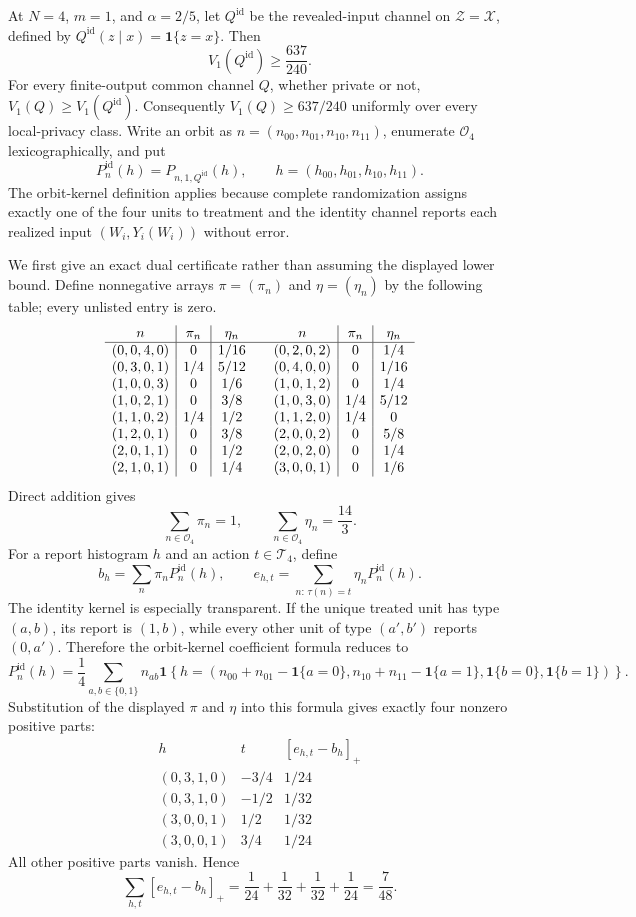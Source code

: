 At \(N=4\), \(m=1\), and \(\alpha=2/5\), let \(Q^{\mathrm{id}}\) be the revealed-input channel on \(\mathcal Z=\mathcal X\), defined by \(Q^{\mathrm{id}}(z\mid x)=\mathbf 1\{z=x\}\). Then
\[
 V_1(Q^{\mathrm{id}})\ge \frac{637}{240}.
\]
For every finite-output common channel \(Q\), whether private or not, \(V_1(Q)\ge V_1(Q^{\mathrm{id}})\). Consequently \(V_1(Q)\ge637/240\) uniformly over every local-privacy class.
Write an orbit as \(n=(n_{00},n_{01},n_{10},n_{11})\), enumerate \(\mathcal O_4\) lexicographically, and put
\[
 P^{\mathrm{id}}_n(h)=P_{n,1,Q^{\mathrm{id}}}(h),
 \qquad
 h=(h_{00},h_{01},h_{10},h_{11}).
\]
The orbit-kernel definition applies because complete randomization assigns exactly one of the four units to treatment and the identity channel reports each realized input \((W_i,Y_i(W_i))\) without error.

We first give an exact dual certificate rather than assuming the displayed lower bound. Define nonnegative arrays \(\pi=(\pi_n)\) and \(\eta=(\eta_n)\) by the following table; every unlisted entry is zero.
\[
\begin{array}{c|c|c@{\qquad}c|c|c}
n&\pi_n&\eta_n&n&\pi_n&\eta_n\\ \hline
(0,0,4,0)&0&1/16 &(0,2,0,2)&0&1/4\\
(0,3,0,1)&1/4&5/12 &(0,4,0,0)&0&1/16\\
(1,0,0,3)&0&1/6 &(1,0,1,2)&0&1/4\\
(1,0,2,1)&0&3/8 &(1,0,3,0)&1/4&5/12\\
(1,1,0,2)&1/4&1/2 &(1,1,2,0)&1/4&0\\
(1,2,0,1)&0&3/8 &(2,0,0,2)&0&5/8\\
(2,0,1,1)&0&1/2 &(2,0,2,0)&0&1/4\\
(2,1,0,1)&0&1/4 &(3,0,0,1)&0&1/6
\end{array}
\]
Direct addition gives
\[
 \sum_{n\in\mathcal O_4}\pi_n=1,
 \qquad
 \sum_{n\in\mathcal O_4}\eta_n=\frac{14}{3}.
\]
For a report histogram \(h\) and an action \(t\in\mathcal T_4\), define
\[
 b_h=\sum_n\pi_nP^{\mathrm{id}}_n(h),
 \qquad
 e_{h,t}=\sum_{n:\,\tau(n)=t}\eta_nP^{\mathrm{id}}_n(h).
\]
The identity kernel is especially transparent. If the unique treated unit has type \((a,b)\), its report is \((1,b)\), while every other unit of type \((a',b')\) reports \((0,a')\). Therefore the orbit-kernel coefficient formula reduces to
\[
 P^{\mathrm{id}}_n(h)
 =\frac14\sum_{a,b\in\{0,1\}}n_{ab}
 \mathbf 1\!\left\{
 h=\left(
 n_{00}+n_{01}-\mathbf 1\{a=0\},
 n_{10}+n_{11}-\mathbf 1\{a=1\},
 \mathbf 1\{b=0\},
 \mathbf 1\{b=1\}
 \right)\right\}.
\]
Substitution of the displayed \(\pi\) and \(\eta\) into this formula gives exactly four nonzero positive parts:
\[
\begin{array}{c|c|c}
h&t&[e_{h,t}-b_h]_+\\ \hline
(0,3,1,0)&-3/4&1/24\\
(0,3,1,0)&-1/2&1/32\\
(3,0,0,1)& 1/2&1/32\\
(3,0,0,1)& 3/4&1/24
\end{array}
\]
All other positive parts vanish. Hence
\[
 \sum_{h,t}[e_{h,t}-b_h]_+
 =\frac1{24}+\frac1{32}+\frac1{32}+\frac1{24}
 =\frac7{48}.
\]

